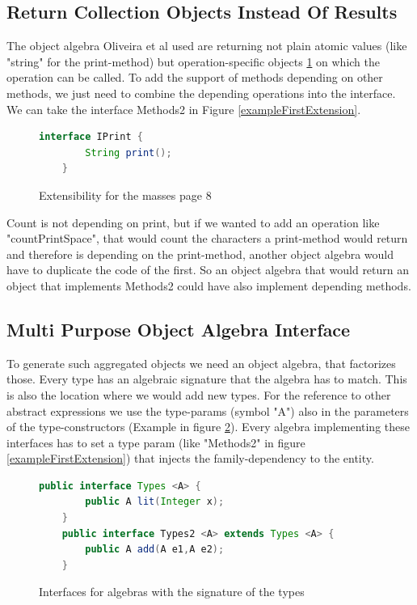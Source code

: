 \documentclass{report}
\begin{document}
\subsection{Return Collection Objects Instead Of Results}

The object algebra Oliveira et al \cite{Oliv-Extensibility-2012} used are returning not plain atomic values (like "string" for the print-method) but operation-specific objects \ref{iPrint} on which the operation can be called. To add the support of methods depending on other methods, we just need to combine the depending operations into the interface. We can take the interface Methods2 in Figure \ref{exampleFirstExtension}.

\begin{figure}[h]
\begin{lstlisting}[language=java]
    interface IPrint {
        String print();
    }
\end{lstlisting}
\caption{Extensibility for the masses \cite{Oliv-Extensibility-2012} page 8}
\label{iPrint}
\end{figure}

Count is not depending on print, but if we wanted to add an operation like "countPrintSpace", that would count the characters a print-method would return and therefore is depending on the print-method, another object algebra would have to duplicate the code of the first. So an object algebra that would return an object that implements Methods2 could have also implement depending methods.

\subsection{Multi Purpose Object Algebra Interface}

To generate such aggregated objects we need an object algebra, that factorizes those. Every type has an algebraic signature \cite{Oliv-Extensibility-2012} that the algebra has to match. This is also the location where we would add new types. For the reference to other abstract expressions we use the type-params (symbol "A") also in the parameters of the type-constructors (Example in figure \ref{algebraInterfaces}). Every algebra implementing these interfaces has to set a type param (like "Methods2" in figure \ref{exampleFirstExtension}) that injects the family-dependency to the entity.

\begin{figure}[t]
\begin{lstlisting}[language=java]
    public interface Types <A> {
        public A lit(Integer x);
    }
    public interface Types2 <A> extends Types <A> {
        public A add(A e1,A e2);
    }
\end{lstlisting}
\caption{Interfaces for algebras with the signature of the types}
\label{algebraInterfaces}
\end{figure}
\end{document}
